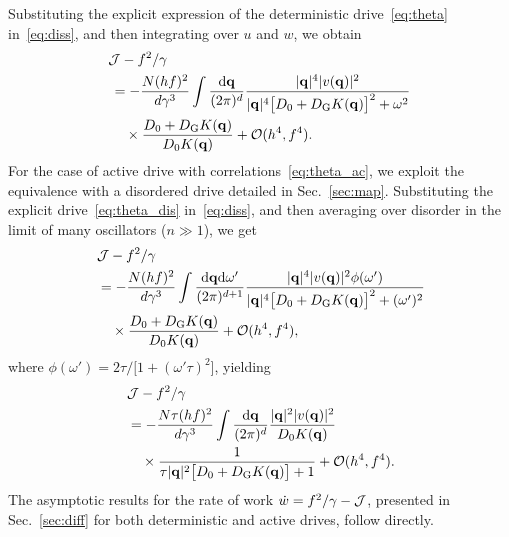 \documentclass[superscriptaddress, twocolumn, prx, longbibliography, nofootinbib]{revtex4-1}
\begin{document}
Substituting the explicit expression of the deterministic drive~\eqref{eq:theta} in~\eqref{eq:diss}, and then integrating over $u$ and $w$, we obtain
\begin{equation}
	\begin{aligned}
		&{\cal J} - f^2/\gamma
		\\
		&\,= - \frac{N(hf)^2}{d\gamma^3} \int \frac{{\rm d}{\bf q}}{(2\pi)^d} \frac{|{\bf q}|^4 |v({\bf q})|^2}{|{\bf q}|^4\big[D_0+D_{\rm G}K({\bf q})\big]^2 + \omega^2}
		\\
		&\,\quad\times \frac{D_0+D_{\rm G}K({\bf q})}{D_0K({\bf q})} + {\cal O}(h^4,f^4) .
	\end{aligned}
\end{equation}
For the case of active drive with correlations~\eqref{eq:theta_ac}, we exploit the equivalence with a disordered drive detailed in Sec.~\ref{sec:map}. Substituting the explicit drive~\eqref{eq:theta_dis} in~\eqref{eq:diss}, and then averaging over disorder in the limit of many oscillators ($n\gg1$), we get
\begin{equation}
	\begin{aligned}
		&{\cal J} - f^2/\gamma
		\\
		\,&= - \frac{N(hf)^2}{d\gamma^3} \int \frac{{\rm d}{\bf q}{\rm d}\omega'}{(2\pi)^{d+1}} \frac{|{\bf q}|^4 |v({\bf q})|^2 \phi(\omega')}{|{\bf q}|^4\big[D_0+D_{\rm G}K({\bf q})\big]^2 + (\omega')^2}
		\\
		&\quad\times \frac{D_0+D_{\rm G}K({\bf q})}{D_0K({\bf q})} + {\cal O}(h^4,f^4) ,
	\end{aligned}
\end{equation}
where $\phi(\omega') = 2\tau/\big[1+(\omega'\tau)^2\big]$, yielding
\begin{equation}
	\begin{aligned}
		&{\cal J} - f^2/\gamma
		\\
		\,&= - \frac{N\tau(hf)^2}{d\gamma^3} \int \frac{{\rm d}{\bf q}}{(2\pi)^d} \frac{|{\bf q}|^2 |v({\bf q})|^2}{D_0 K({\bf q})}
		\\
		&\quad\times \frac{1}{\tau|{\bf q}|^2\big[D_0+D_{\rm G}K({\bf q})\big] + 1} + {\cal O}(h^4,f^4) .
	\end{aligned}
\end{equation}
The asymptotic results for the rate of work $\dot w = f^2/\gamma-{\cal J}$, presented in Sec.~\ref{sec:diff} for both deterministic and active drives, follow directly.
\end{document}
